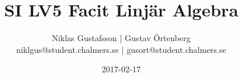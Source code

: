 \documentclass{article}
\title{SI LV5 Facit Linjär Algebra}
\author{Niklas Gustafsson | Gustav Örtenberg  \\ \small{niklgus@student.chalmers.se} | \small{gusort@student.chalmers.se}}
\date{2017-02-17}
\begin{document}
\maketitle
\section{}


\section{}


\newpage
\section{}


\section{}


\section{}


\section{}

\end{document}
